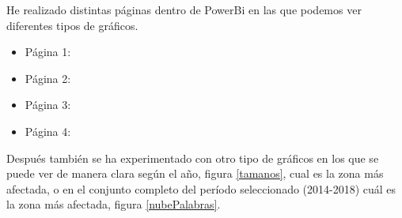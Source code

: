 He realizado distintas páginas dentro de PowerBi en las que podemos ver diferentes tipos de gráficos.

\begin{itemize}
	\item Página 1: 
	
	\item Página 2: 
	

	\item Página 3: 
	\item Página 4: 
\end{itemize}

Después también se ha experimentado con otro tipo de gráficos en los que se puede ver de manera clara según el año, figura \ref{tamanos}, cual es la zona más afectada, o en el conjunto completo del período seleccionado (2014-2018) cuál es la zona más afectada, figura \ref{nubePalabras}.

      
      

     
